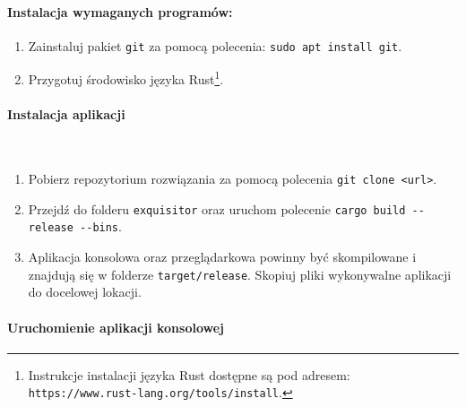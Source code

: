             \paragraph{Instalacja wymaganych programów:}

                \begin{enumerate}
                    \item {
                        Zainstaluj pakiet \texttt{git} za pomocą polecenia: \texttt{sudo apt install git}.
                    }
                    \item {
                        Przygotuj środowisko języka Rust\footnote{Instrukcje instalacji języka Rust dostępne są pod adresem: \texttt{https://www.rust-lang.org/tools/install}.}.
                    }
                \end{enumerate}

            \paragraph{Instalacja aplikacji} \\
                
                \begin{enumerate}
                    \item {
                        Pobierz repozytorium rozwiązania za pomocą polecenia \texttt{git clone <url>}.
                    }
                    \item {
                        Przejdź do folderu \texttt{exquisitor} oraz uruchom polecenie \texttt{cargo build -\phantom{}-release -\phantom{}-bins}.
                    }
                    \item {
                        Aplikacja konsolowa oraz przeglądarkowa powinny być skompilowane i znajdują się w folderze \texttt{target/release}. 
                        Skopiuj pliki wykonywalne aplikacji do docelowej lokacji.
                    }
                \end{enumerate}
            
            \paragraph{Uruchomienie aplikacji konsolowej}

